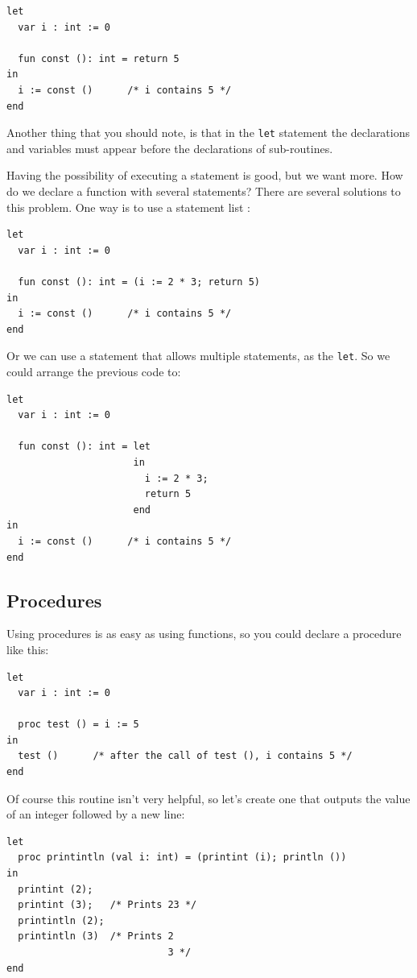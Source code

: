\documentclass[a4paper, 11pt]{report}
\newcommand{\keyword}[1]{\texttt{#1}}
\begin{document}
\begin{lstlisting}
let
  var i : int := 0

  fun const (): int = return 5
in
  i := const ()      /* i contains 5 */
end
\end{lstlisting}

Another thing that you should note, is that in the \keyword{let} statement the
declarations and variables must appear before the declarations of sub-routines.

Having the possibility of executing a statement is good, but we want more. How do
we declare a function with several statements? There are several solutions to this
problem. One way is to use a statement list :

\begin{lstlisting}
let
  var i : int := 0

  fun const (): int = (i := 2 * 3; return 5)
in
  i := const ()      /* i contains 5 */
end
\end{lstlisting}

Or we can use a statement that allows multiple statements, as the \keyword{let}. So
we could arrange the previous code to:

\begin{lstlisting}
let
  var i : int := 0

  fun const (): int = let
                      in
                        i := 2 * 3;
                        return 5
                      end
in
  i := const ()      /* i contains 5 */
end
\end{lstlisting}

\subsection{Procedures}

Using procedures is as easy as using functions, so you could declare a procedure like this:


\begin{lstlisting}
let
  var i : int := 0

  proc test () = i := 5
in
  test ()      /* after the call of test (), i contains 5 */
end
\end{lstlisting}

Of course this routine isn't very helpful, so let's create one that outputs the value of
an integer followed by a new line:

\begin{lstlisting}
let
  proc printintln (val i: int) = (printint (i); println ())
in
  printint (2);
  printint (3);   /* Prints 23 */
  printintln (2);
  printintln (3)  /* Prints 2
                            3 */
end
\end{lstlisting}
\end{document}
